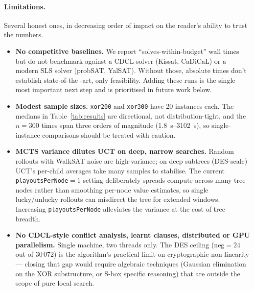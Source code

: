 \documentclass[11pt]{article}
\begin{document}
\paragraph{Limitations.} Several honest ones, in decreasing order
of impact on the reader's ability to trust the numbers.

\begin{itemize}\itemsep0pt

\item \textbf{No competitive baselines.} We report
``solves-within-budget'' wall times but do not benchmark against a
CDCL solver (Kissat, CaDiCaL) or a modern SLS solver (probSAT,
YalSAT). Without those, absolute times don't establish state-of-the
-art, only feasibility. Adding these runs is the single most
important next step and is prioritised in future work below.

\item \textbf{Modest sample sizes.} \texttt{xor200} and \texttt{xor300}
have 20 instances each. The medians in Table~\ref{tab:results} are
directional, not distribution-tight, and the $n{=}300$ times span
three orders of magnitude (1.8~s--3102~s), so single-instance
comparisons should be treated with caution.

\item \textbf{MCTS variance dilutes UCT on deep, narrow searches.}
Random rollouts with WalkSAT noise are high-variance; on deep
subtrees (DES-scale) UCT's per-child averages take many samples to
stabilise. The current
\texttt{playoutsPerNode}$= 1$ setting deliberately spreads
compute across many tree nodes rather than smoothing per-node
value estimates, so single lucky/unlucky rollouts can misdirect the
tree for extended windows. Increasing \texttt{playoutsPerNode}
alleviates the variance at the cost of tree breadth.

\item \textbf{No CDCL-style conflict analysis, learnt clauses,
distributed or GPU parallelism.} Single machine, two threads only.
The DES ceiling ($\text{neg} = 24$ out of $30\,072$) is the
algorithm's practical limit on cryptographic non-linearity —
closing that gap would require algebraic techniques (Gaussian
elimination on the XOR substructure, or S-box specific reasoning)
that are outside the scope of pure local search.

\end{itemize}
\end{document}
